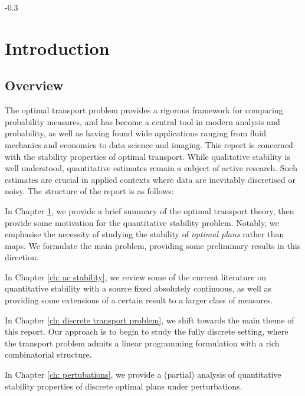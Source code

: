 \documentclass[11pt, oneside, titlepage]{book}
\theoremstyle{plain}
\theoremstyle{definition}
\begin{document}
\vfill

\vspace*{\fill}


\begin{spacing}{-0.3}
    \parskip 0.7mm
    \tableofcontents
\end{spacing}

\mainmatter

\chapter{Introduction}
\label{ch: intro}


\section{Overview}

The optimal transport problem provides a rigorous framework for comparing probability measures, and has become a central tool in modern analysis and probability, as well as having found wide applications ranging from fluid mechanics and economics to data science and imaging. This report is concerned with the stability properties of optimal transport. While qualitative stability is well understood, quantitative estimates remain a subject of active research. Such estimates are crucial in applied contexts where data are inevitably discretised or noisy. The structure of the report is as follows:

In Chapter \ref{ch: intro}, we provide a brief summary of the optimal transport theory, then provide some motivation for the quantitative stability problem. Notably, we emphasise the necessity of studying the stability of \textit{optimal plans} rather than maps. We formulate the main problem, providing some preliminary results in this direction. 

In Chapter \ref{ch: ac stability}, we review some of the current literature on quantitative stability with a source fixed absolutely continuous, as well as providing some extensions of a certain result to a larger class of measures. 

In Chapter \ref{ch: discrete transport problem}, we shift towards the main theme of this report. Our approach is to begin to study the fully discrete setting, where the transport problem admits a linear programming formulation with a rich combinatorial structure.

In Chapter \ref{ch: pertubations}, we provide a (partial) analysis of quantitative stability properties of discrete optimal plans under perturbations.
\end{document}
